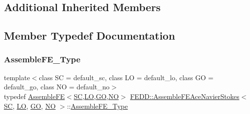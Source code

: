 \subsection*{Additional Inherited Members}


\subsection{Member Typedef Documentation}
\mbox{\label{classFEDD_1_1AssembleFEAceNavierStokes_adeb960c158fe3fb391238331add6f26f}} 
\subsubsection{\texorpdfstring{Assemble\+F\+E\+\_\+\+Type}{AssembleFE\_Type}}
{\footnotesize\ttfamily template$<$class SC  = default\+\_\+sc, class LO  = default\+\_\+lo, class GO  = default\+\_\+go, class NO  = default\+\_\+no$>$ \\
typedef \hyperlink{classFEDD_1_1AssembleFE}{Assemble\+FE}$<$\hyperlink{fe__test__laplace_8cpp_a79c7e86a57edbb2a5a53242bcd04e41e}{SC},\hyperlink{fe__test__laplace_8cpp_ad6a38c9f07d3fd633eefca5bccad8410}{LO},\hyperlink{fe__test__laplace_8cpp_afa2946b509009b4f45eb04bd8c5b27d9}{GO},\hyperlink{fe__test__laplace_8cpp_a5e24f37b28787429872b6ecb1d0417ce}{NO}$>$ \hyperlink{classFEDD_1_1AssembleFEAceNavierStokes}{F\+E\+D\+D\+::\+Assemble\+F\+E\+Ace\+Navier\+Stokes}$<$ \hyperlink{fe__test__laplace_8cpp_a79c7e86a57edbb2a5a53242bcd04e41e}{SC}, \hyperlink{fe__test__laplace_8cpp_ad6a38c9f07d3fd633eefca5bccad8410}{LO}, \hyperlink{fe__test__laplace_8cpp_afa2946b509009b4f45eb04bd8c5b27d9}{GO}, \hyperlink{fe__test__laplace_8cpp_a5e24f37b28787429872b6ecb1d0417ce}{NO} $>$\+::\hyperlink{classFEDD_1_1AssembleFE_ab2c8bb1fd65dfcf7899a7c4a4a8a4021}{Assemble\+F\+E\+\_\+\+Type}}

\mbox{\label{classFEDD_1_1AssembleFEAceNavierStokes_a077bd68fc7a8d900e2a2407dd1265244}} 
